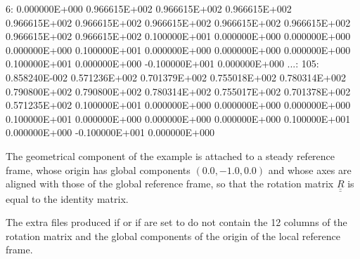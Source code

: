 \begin{inputfile}[frame=single]
  6: 0.000000E+000  0.966615E+002  0.966615E+002  0.966615E+002  0.966615E+002
     0.966615E+002  0.966615E+002  0.966615E+002  0.966615E+002  0.966615E+002
     0.966615E+002  0.100000E+001  0.000000E+000  0.000000E+000  0.000000E+000
     0.100000E+001  0.000000E+000  0.000000E+000  0.000000E+000  0.100000E+001
     0.000000E+000 -0.100000E+001  0.000000E+000
...:
105: 0.858240E-002  0.571236E+002  0.701379E+002  0.755018E+002  0.780314E+002
     0.790800E+002  0.790800E+002  0.780314E+002  0.755017E+002  0.701378E+002
     0.571235E+002  0.100000E+001  0.000000E+000  0.000000E+000  0.000000E+000
     0.100000E+001  0.000000E+000  0.000000E+000  0.000000E+000  0.100000E+001
     0.000000E+000 -0.100000E+001  0.000000E+000
\end{inputfile}
The geometrical component of the example is attached to a steady 
reference frame, whose origin has global components $( 0.0, -1.0, 0.0 )$ 
and whose axes are aligned with those of the global reference frame, so 
that the rotation matrix $\underline{\underline{R}}$ is equal to the 
identity matrix.

The extra files produced if   
or if  are set to  
do not contain the 12 columns of the rotation matrix and 
the global components of the origin of the local reference frame.

